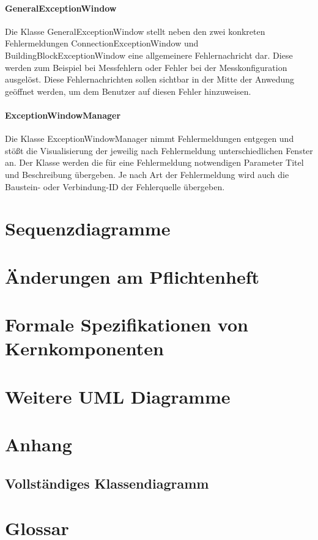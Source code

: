 \documentclass[parskip=full]{scrartcl}
\begin{document}
\paragraph{GeneralExceptionWindow}

Die Klasse GeneralExceptionWindow stellt neben den zwei konkreten Fehlermeldungen ConnectionExceptionWindow und BuildingBlockExceptionWindow eine allgemeinere Fehlernachricht dar. Diese werden zum Beispiel bei Messfehlern oder Fehler bei der Messkonfiguration ausgelöst. Diese Fehlernachrichten sollen sichtbar in der Mitte der Anwedung geöffnet werden, um dem Benutzer auf diesen Fehler hinzuweisen. 

\clearpage

\paragraph{ExceptionWindowManager}

Die Klasse ExceptionWindowManager nimmt Fehlermeldungen entgegen und stößt die Visualisierung der jeweilig nach Fehlermeldung unterschiedlichen Fenster an. Der Klasse werden die für eine Fehlermeldung notwendigen Parameter Titel und  Beschreibung übergeben. Je nach Art der Fehlermeldung wird auch die Baustein- oder Verbindung-ID der Fehlerquelle übergeben.

\clearpage
\section{Sequenzdiagramme}


\clearpage
\section{Änderungen am Pflichtenheft}


\clearpage
\section{Formale Spezifikationen von Kernkomponenten}

\clearpage
\section{Weitere UML Diagramme}


\clearpage
\section{Anhang}


\clearpage
\subsection{Vollständiges Klassendiagramm}


\clearpage
\section{Glossar}\label{glossar}

\renewcommand*{\glossarysection}[2][]{}	%
\printnoidxglossaries				%
\end{document}
